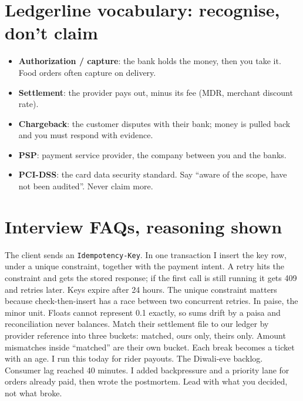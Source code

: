 \documentclass[10pt,a4paper]{article}
\begin{document}
\section{Ledgerline vocabulary: recognise, don't claim \LRN}
\begin{itemize}
  \item \textbf{Authorization / capture}: the bank holds the money, then you take it. Food orders often capture on delivery.
  \item \textbf{Settlement}: the provider pays out, minus its fee (MDR, merchant discount rate).
  \item \textbf{Chargeback}: the customer disputes with their bank; money is pulled back and you must respond with evidence.
  \item \textbf{PSP}: payment service provider, the company between you and the banks.
  \item \textbf{PCI-DSS}: the card data security standard. Say ``aware of the scope, have not been audited''. Never claim more.
\end{itemize}

\section{Interview FAQs, reasoning shown}
\A The client sends an \texttt{Idempotency-Key}. In one transaction I insert the key row, under a unique constraint, together with the payment intent. A retry hits the constraint and gets the stored response; if the first call is still running it gets 409 and retries later. Keys expire after 24 hours. The unique constraint matters because check-then-insert has a race between two concurrent retries.
\A In paise, the minor unit. Floats cannot represent 0.1 exactly, so sums drift by a paisa and reconciliation never balances.
\A Match their settlement file to our ledger by provider reference into three buckets: matched, ours only, theirs only. Amount mismatches inside ``matched'' are their own bucket. Each break becomes a ticket with an age. \K I run this today for rider payouts.
\A The Diwali-eve backlog. Consumer lag reached 40 minutes. I added backpressure and a priority lane for orders already paid, then wrote the postmortem. Lead with what you decided, not what broke.
\end{document}
